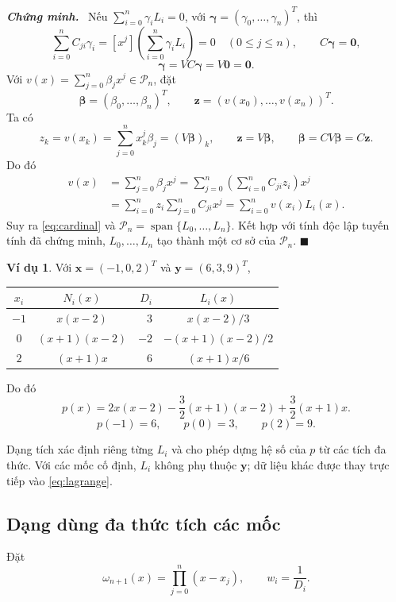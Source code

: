 \documentclass[12pt,a4paper,oneside]{book}
\numberwithin{algorithm}{chapter}
\theoremstyle{definition}
\newtheorem{vidu}{Ví dụ}[chapter]
\newenvironment{chungminh}{\par\medskip\noindent\textbf{\textit{\color{mainblue}Chứng minh.}}\ }{\hfill$\blacksquare$\par\medskip}
\begin{document}
\begin{chungminh}
Nếu $\sum_{i=0}^n\gamma_iL_i=0$, với $\boldsymbol\gamma=(\gamma_0,\ldots,\gamma_n)^T$, thì
\[
 \sum_{i=0}^n C_{ji}\gamma_i
 =[x^j]\left(\sum_{i=0}^n\gamma_iL_i\right)=0\quad(0\leq j\leq n),
 \qquad C\boldsymbol\gamma=\mathbf0,
\]
\[
 \boldsymbol\gamma=VC\boldsymbol\gamma=V\mathbf0=\mathbf0.
\]
Với $v(x)=\sum_{j=0}^n\beta_jx^j\in\mathcal P_n$, đặt
\[
 \boldsymbol\beta=(\beta_0,\ldots,\beta_n)^T,\qquad
 \mathbf z=(v(x_0),\ldots,v(x_n))^T.
\]
Ta có
\[
 z_k=v(x_k)=\sum_{j=0}^n x_k^j\beta_j=(V\boldsymbol\beta)_k,
 \qquad \mathbf z=V\boldsymbol\beta,
 \qquad \boldsymbol\beta=CV\boldsymbol\beta=C\mathbf z.
\]
Do đó
\begin{align*}
 v(x)&=\sum_{j=0}^n\beta_jx^j
 =\sum_{j=0}^n\left(\sum_{i=0}^n C_{ji}z_i\right)x^j\\
 &=\sum_{i=0}^n z_i\sum_{j=0}^n C_{ji}x^j
 =\sum_{i=0}^n v(x_i)L_i(x).
\end{align*}
Suy ra \eqref{eq:cardinal} và $\mathcal P_n=\operatorname{span}\{L_0,\ldots,L_n\}$. Kết hợp với tính độc lập tuyến tính đã chứng minh, $L_0,\ldots,L_n$ tạo thành một cơ sở của $\mathcal P_n$.
\end{chungminh}

\begin{vidu}
Với $\mathbf x=(-1,0,2)^T$ và $\mathbf y=(6,3,9)^T$,
\begin{center}
\begin{tabular}{c|c|r|c}
\toprule
$x_i$ & $N_i(x)$ & $D_i$ & $L_i(x)$\\
\midrule
$-1$ & $x(x-2)$ & $3$ & $x(x-2)/3$\\
$0$ & $(x+1)(x-2)$ & $-2$ & $-(x+1)(x-2)/2$\\
$2$ & $(x+1)x$ & $6$ & $(x+1)x/6$\\
\bottomrule
\end{tabular}
\end{center}
Do đó
\[
 p(x)=2x(x-2)-\frac32(x+1)(x-2)+\frac32(x+1)x.
\]
\[
 p(-1)=6,\qquad p(0)=3,\qquad p(2)=9.
\]
\end{vidu}

Dạng tích xác định riêng từng $L_i$ và cho phép dựng hệ số của $p$ từ các tích đa thức. Với các mốc cố định, $L_i$ không phụ thuộc $\mathbf y$; dữ liệu khác được thay trực tiếp vào \eqref{eq:lagrange}.

\subsection{Dạng dùng đa thức tích các mốc}
Đặt
\[
 \omega_{n+1}(x)=\prod_{j=0}^n(x-x_j),\qquad w_i=\frac1{D_i}.
\]
\end{document}

